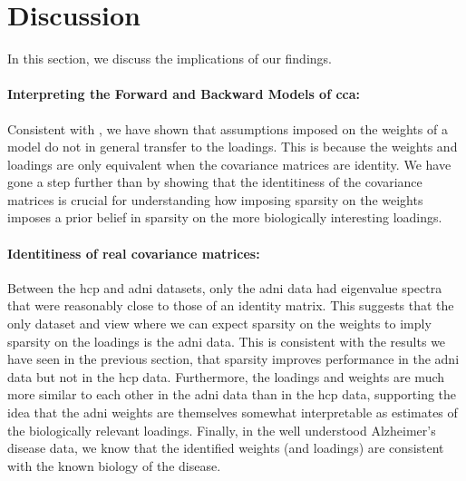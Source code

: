 \section{Discussion}

In this section, we discuss the implications of our findings.

\paragraph{Interpreting the Forward and Backward Models of \acrshort{cca}:} Consistent with \cite{haufe2014interpretation}, we have shown that assumptions imposed on the \gls{weights} of a model do not in general transfer to the loadings.
This is because the \gls{weights} and \gls{loadings} are only equivalent when the covariance matrices are identity.
We have gone a step further than \cite{haufe2014interpretation} by showing that the identitiness of the covariance matrices is crucial for understanding how imposing sparsity on the \gls{weights} imposes a prior belief in sparsity on the more biologically interesting loadings.

\paragraph{Identitiness of real covariance matrices:} Between the \acrshort{hcp} and \acrshort{adni} datasets, only the \acrshort{adni} data had eigenvalue spectra that were reasonably close to those of an identity matrix.
This suggests that the only dataset and view where we can expect sparsity on the \gls{weights} to imply sparsity on the \gls{loadings} is the \acrshort{adni} data.
This is consistent with the results we have seen in the previous section, that sparsity improves performance in the \acrshort{adni} data but not in the \acrshort{hcp} data.
Furthermore, the \gls{loadings} and \gls{weights} are much more similar to each other in the \acrshort{adni} data than in the \acrshort{hcp} data, supporting the idea that the \acrshort{adni} \gls{weights} are themselves somewhat interpretable as estimates of the biologically relevant loadings.
Finally, in the well understood Alzheimer's disease data, we know that the identified \gls{weights} (and loadings) are consistent with the known biology of the disease.

